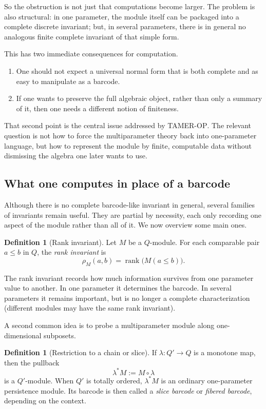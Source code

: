 \documentclass[11pt]{article}
\newcommand{\TAMER}{\textsc{TAMER-OP}}
\theoremstyle{definition}
\newtheorem{defn}[theorem]{Definition}
\theoremstyle{remark}
\begin{document}
So the obstruction is not just that computations become larger. The problem is also structural: in one parameter, the module itself can be packaged into a complete discrete invariant; but, in several parameters, there is in general no analogous finite complete invariant of that simple form.

This has two immediate consequences for computation.

\begin{enumerate}[label=(\roman*)]
    \item One should not expect a universal normal form that is both complete and as easy to manipulate as a barcode.
    \item If one wants to preserve the full algebraic object, rather than only a summary of it, then one needs a different notion of finiteness.
\end{enumerate}

That second point is the central issue addressed by \TAMER{}. The relevant question is not how to force the multiparameter theory back into one-parameter language, but how to represent the module by finite, computable data without dismissing the algebra one later wants to use.

\subsection{What one computes in place of a barcode}

Although there is no complete barcode-like invariant in general, several families of invariants remain useful. They are partial by necessity, each only recording one aspect of the module rather than all of it. We now overview some main ones.

\begin{defn}[Rank invariant]
Let $M$ be a $Q$-module. For each comparable pair $a \leq b$ in $Q$, the \emph{rank invariant} is
\[
\rho_M(a,b) = \operatorname{rank}\bigl(M(a \leq b)\bigr).
\]
\end{defn}

The rank invariant records how much information survives from one parameter value to another. In one parameter it determines the barcode. In several parameters it remains important, but is no longer a complete characterization (different modules may have the same rank invariant).

A second common idea is to probe a multiparameter module along one-dimensional subposets.

\begin{defn}[Restriction to a chain or slice]
If $\lambda : Q' \to Q$ is a monotone map, then the pullback
\[
\lambda^* M := M \circ \lambda
\]
is a $Q'$-module. When $Q'$ is totally ordered, $\lambda^*M$ is an ordinary one-parameter persistence module. Its barcode is then called a \emph{slice barcode} or \emph{fibered barcode}, depending on the context.
\end{defn}
\end{document}
